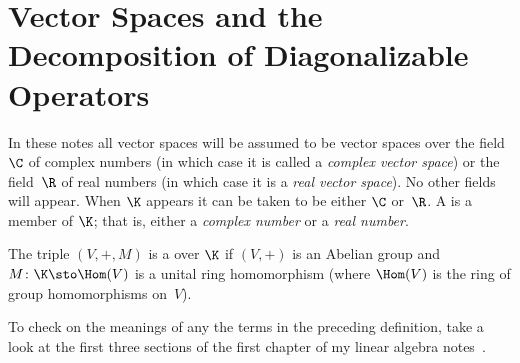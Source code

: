 \section{Vector Spaces and the Decomposition of Diagonalizable Operators}
\begin{conv} In these notes all vector
spaces will be assumed to be vector spaces over the field~$\C$ of complex numbers (in which case it is called a \emph{complex vector space}) or the
field~$\R$ of real numbers (in which case it is a \emph{real vector space}).  No other fields will appear.  When $\K$ appears it can be taken
to be either $\C$ or~$\R$. A
 is a member of $\K$; that is, either a \emph{complex number} or a \emph{real number}.
\end{conv}

\begin{defn}\label{00001} The triple $(V,+,M)$ is a
 over $\K$ if $(V,+)$ is an Abelian group and $M\colon \K \sto \Hom(V)$
is a unital ring homomorphism (where $\Hom(V)$ is the ring of group homomorphisms
on~$V$).
\end{defn}

To check on the meanings of any the terms in the preceding definition, take a look at the first three sections of the first chapter of my
linear algebra notes~\cite{Erdman:2010}.

